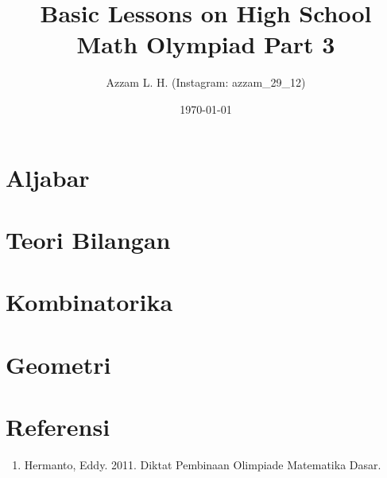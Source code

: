 \title{Basic Lessons on High School Math Olympiad Part 3}
\date{\today}
\author{Azzam L. H. (Instagram: azzam\_29\_12)}
\maketitle
\renewcommand*\contentsname{Daftar Isi}
\tableofcontents
\newpage

\section{Aljabar}







\section{Teori Bilangan}






\section{Kombinatorika}







\section{Geometri}













\section{Referensi}
    \begin{enumerate}
        \item Hermanto, Eddy. 2011. Diktat Pembinaan Olimpiade Matematika Dasar.
    \end{enumerate}



